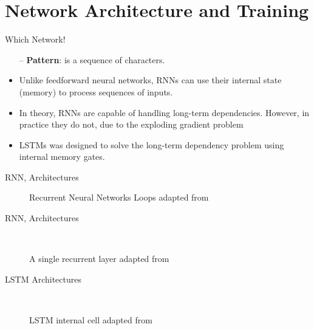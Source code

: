 \section{Network Architecture and Training}

\begin{frame}[fragile]{Which Network!}


		\begin{itemize}
			\item[--] \textbf{Pattern}: is a sequence of characters.
			\item  Unlike feedforward neural networks, RNNs can use their internal state (memory) to process sequences of inputs.
			\item In theory, RNNs are capable of handling long-term dependencies. 	However, in practice they do not, due to the \alert{exploding gradient problem}
			\item LSTMs was designed to solve the long-term dependency problem using internal memory gates.
		\end{itemize}
		
\end{frame}
\begin{frame}[fragile]{RNN, Architectures}
\begin{figure}[t]
	\minipage{\textwidth}
	\centering
	
	\endminipage\hfill
	\caption{Recurrent Neural Networks Loops adapted from~\cite{colah}}\label{Fig:RNN_Rolled_Loop}
	
\end{figure}%
\end{frame}

\begin{frame}[fragile]{RNN, Architectures}
\begin{figure}[t]
	
	\endminipage\hfill
	
	\endminipage\hfill
	
	\endminipage
	\caption{A single recurrent layer adapted from~\cite{colah}}~\label{Fig:LSTM_SimpleRNN}
\end{figure}%
\end{frame}

\begin{frame}[fragile]{LSTM Architectures}
\begin{center}
\begin{figure}[t]
	
	\endminipage
	\caption{LSTM internal cell adapted from~\cite{colah}}~\label{Fig:LSTM_Cell_Chaining}
\end{figure}%
\end{center}
\end{frame}

